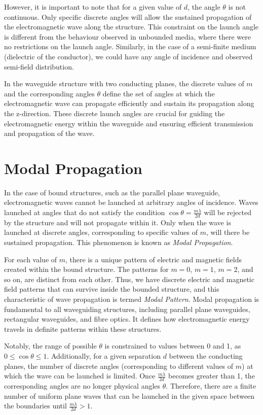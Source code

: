 However, it is important to note that for a given value of $d$, the angle $\theta$ is not continuous. Only specific discrete angles will allow the sustained propagation of the electromagnetic wave along the structure. This constraint on the launch angle is different from the behaviour observed in unbounded media, where there were no restrictions on the launch angle. Similarly, in the case of a semi-finite medium (dielectric of the conductor), we could have any angle of incidence and observed semi-field distribution.

In the waveguide structure with two conducting planes, the discrete values of $m$ and the corresponding angles $\theta$ define the set of angles at which the electromagnetic wave can propagate efficiently and sustain its propagation along the z-direction. These discrete launch angles are crucial for guiding the electromagnetic energy within the waveguide and ensuring efficient transmission and propagation of the wave.

\section{Modal Propagation}
In the case of bound structures, such as the parallel plane waveguide, electromagnetic waves cannot be launched at arbitrary angles of incidence. Waves launched at angles that do not satisfy the condition $\cos\theta = \frac{m\lambda}{2d}$ will be rejected by the structure and will not propagate within it. Only when the wave is launched at discrete angles, corresponding to specific values of $m$, will there be sustained propagation. This phenomenon is known as \textit{Modal Propagation}.

For each value of $m$, there is a unique pattern of electric and magnetic fields created within the bound structure. The patterns for $m=0$, $m=1$, $m=2$, and so on, are distinct from each other. Thus, we have discrete electric and magnetic field patterns that can survive inside the bounded structure, and this characteristic of wave propagation is termed \textit{Modal Pattern}. Modal propagation is fundamental to all waveguiding structures, including parallel plane waveguides, rectangular waveguides, and fibre optics. It defines how electromagnetic energy travels in definite patterns within these structures.

Notably, the range of possible $\theta$ is constrained to values between 0 and 1, as $0 \leq \cos\theta \leq 1$. Additionally, for a given separation $d$ between the conducting planes, the number of discrete angles (corresponding to different values of $m$) at which the wave can be launched is limited. Once $\frac{m\lambda}{2d}$ becomes greater than 1, the corresponding angles are no longer physical angles $\theta$. Therefore, there are a finite number of uniform plane waves that can be launched in the given space between the boundaries until $\frac{m\lambda}{2d} > 1$.

